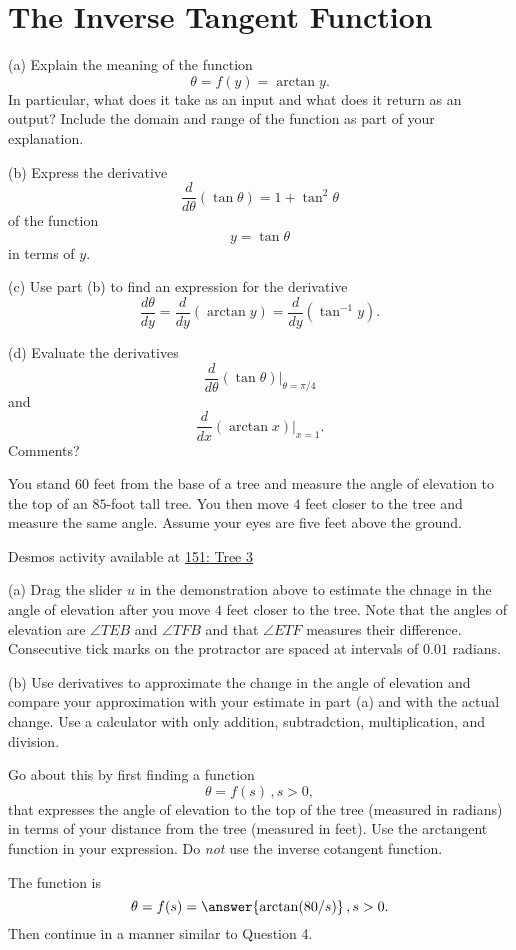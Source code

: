 \documentclass{ximera}
\begin{document}
\section*{The Inverse Tangent Function}
\begin{question}  \label{Q:KKDbret434}
(a) Explain the meaning of the function
\[
        \theta = f(y) = \arctan y .
\]
In particular, what does it take as an input and what does it return as an output? Include the domain and range of the function as part of your explanation.

(b) Express the derivative
\[
     \frac{d}{d\theta} \left( \tan\theta  \right) = 1 + \tan^2\theta
\]
of the function 
\[
    y = \tan\theta
\]
in terms of $y$.

(c) Use part (b) to find an expression for the derivative
\[
   \frac{d\theta}{dy} = \frac{d}{dy} \left(  \arctan y \right) =  \frac{d}{dy} \left(  \tan^{-1} y \right) .
\]

(d) Evaluate the derivatives
\[
   \frac{d}{d\theta} \left( \tan\theta  \right)\Big|_{\theta = \pi/4}
\]
and
\[
  \frac{d}{dx} \left(  \arctan x \right)\Big|_{x=1} . 
\]
Comments?
\end{question}

\begin{question}  \label{Q45544fhL}
You stand $60$ feet from the base of a tree and measure the angle of elevation to the top of an $85$-foot tall tree. You then move $4$ feet closer to the tree and measure the same angle. Assume your eyes are five feet above the ground. 

\begin{onlineOnly}
    \begin{center}
\end{center}
\end{onlineOnly}

Desmos activity available at \href{https://www.desmos.com/calculator/qqgvq3noah}{151: Tree 3}


(a) Drag the slider $u$ in the demonstration above to estimate the chnage in the angle of elevation after you move $4$ feet closer to the tree. Note that the angles of elevation are $\angle TEB$ and $\angle TFB$ and that $\angle ETF$ measures their difference.   Consecutive tick marks on the protractor are spaced at intervals of $0.01$ radians.

(b) Use derivatives to approximate the change in the angle of elevation and compare your approximation with your estimate in part (a) and with the actual change. Use a calculator with only addition, subtradction, multiplication, and division.

Go about this by first finding a function
\[
    \theta = f(s) \, , s>0 ,
\]
that expresses the angle of elevation to the top of the tree (measured in radians) in terms of your distance from the tree (measured in feet). Use the arctangent function in your expression. Do \emph{not} use the inverse cotangent function.

The function is 
\[
      \theta = f(s)  = \answer{\arctan(80/s)} \, , s>0 .
\]
Then continue in a manner similar to Question 4. 

\end{question}
\end{document}

